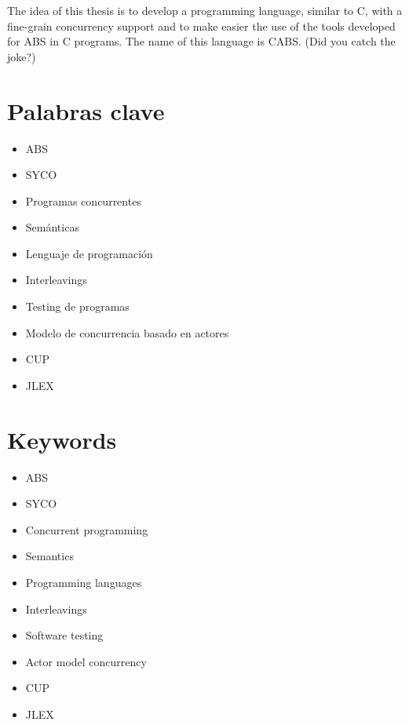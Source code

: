 The idea of this thesis is to develop a programming language, similar to C, with a fine-grain concurrency support and to make easier the use of the tools developed for ABS in C programs. The name of this language is CABS. (Did you catch the joke?)\\

\newpage
\thispagestyle{empty}

\chapter*{Palabras clave}
\thispagestyle{empty}
\begin{itemize}
  \item ABS
  \item SYCO
  \item Programas concurrentes
  \item Semánticas
  \item Lenguaje de programación
  \item Interleavings
  \item Testing de programas
  \item Modelo de concurrencia basado en actores
  \item CUP
  \item JLEX
\end{itemize}

\newpage
\thispagestyle{empty}

\chapter*{Keywords}
\thispagestyle{empty}
\begin{itemize}
  \item ABS
  \item SYCO
  \item Concurrent programming
  \item Semantics
  \item Programming languages
  \item Interleavings
  \item Software testing
  \item Actor model concurrency
  \item CUP
  \item JLEX
\end{itemize}

\newpage
\thispagestyle{empty}
